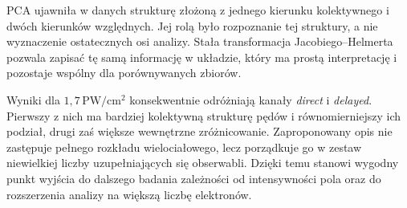 \documentclass[12pt,letterpaper,oneside]{report}
\numberwithin{equation}{chapter}
\numberwithin{figure}{chapter}
\numberwithin{table}{chapter}
\newcommand{\direct}{\textit{direct}}
\newcommand{\delayed}{\textit{delayed}}
\begin{document}
PCA ujawniła w danych strukturę złożoną z jednego kierunku kolektywnego
i dwóch kierunków względnych. Jej rolą było rozpoznanie tej struktury,
a nie wyznaczenie ostatecznych osi analizy. Stała transformacja
Jacobiego--Helmerta pozwala zapisać tę samą informację w układzie, który
ma prostą interpretację i pozostaje wspólny dla porównywanych zbiorów.

Wyniki dla \(1{,}7\,\mathrm{PW/cm^2}\) konsekwentnie odróżniają kanały
\direct{} i \delayed{}. Pierwszy z nich ma bardziej kolektywną strukturę
pędów i równomierniejszy ich podział, drugi zaś większe wewnętrzne
zróżnicowanie. Zaproponowany opis nie zastępuje pełnego rozkładu
wielociałowego, lecz porządkuje go w zestaw niewielkiej liczby
uzupełniających się obserwabli. Dzięki temu stanowi wygodny punkt wyjścia
do dalszego badania zależności od intensywności pola oraz do rozszerzenia
analizy na większą liczbę elektronów.
\end{document}
